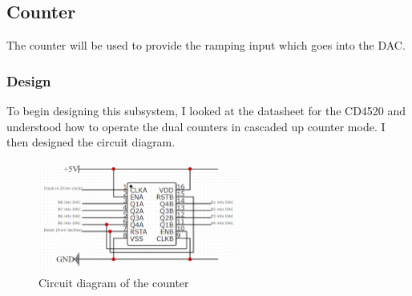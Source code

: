 \subsection{Counter}
The counter will be used to provide the ramping input which goes into the DAC.
\subsubsection{Design}
To begin designing this subsystem, I looked at the datasheet for the CD4520 and understood how to operate the dual counters in cascaded up counter mode. I then designed the circuit diagram.
\begin{figure}[H]
    \centering
    \includegraphics[width=0.6\textwidth]{images/counterCircuitDiagram.png}
    \caption{Circuit diagram of the counter}
    \label{fig:counterCircuitDiagram}
\end{figure}
